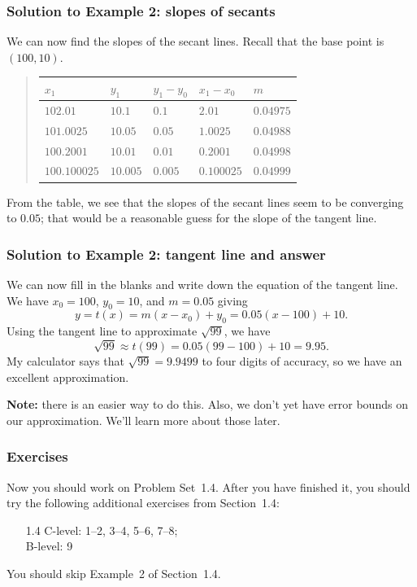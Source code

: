 \documentclass[serif,ignorenonframetext]{beamer}
\begin{document}
\begin{frame}
  \frametitle{Solution to Example 2: slopes of secants}
  We can now find the slopes of the secant lines.  Recall that the
  base point is $(100,10)$.
  \begin{quote}
    \begin{tabular}{|l|l|l|l|l|}
      \hline
      $x_1$        & $y_1$    & $y_1-y_0$   & $x_1-x_0$   & $m$       \\
      \hline
      $102.01$     & $10.1$   & $0.1$       & $2.01$      & $0.04975$ \\
      $101.0025$   & $10.05$  & $0.05$      & $1.0025$    & $0.04988$ \\
      $100.2001$   & $10.01$  & $0.01$      & $0.2001$    & $0.04998$ \\
      $100.100025$ & $10.005$ & $0.005$     & $0.100025$  & $0.04999$ \\
      \hline
    \end{tabular}
  \end{quote}
  From the table, we see that the slopes of the secant lines seem to
  be converging to $0.05$; that would be a reasonable guess for the slope
  of the tangent line.
\end{frame}

\begin{frame}
  \frametitle{Solution to Example 2: tangent line and answer}
  We can now fill in the blanks and write down the equation of
  the tangent line.  We have $x_0=100$, $y_0=10$, and $m=0.05$
  giving
  \begin{displaymath}
    y=t(x)=m(x-x_0)+y_0 = 0.05(x-100)+10.
  \end{displaymath}
  Using the tangent line to approximate $\sqrt{99}$, we have
  \begin{displaymath}
    \sqrt{99} \approx t(99) = 0.05(99-100)+10 = 9.95.
  \end{displaymath}
  My calculator says that $\sqrt{99}=9.9499$ to four digits of accuracy,
  so we have an excellent approximation.

  \textbf{Note:} there is an easier way to do this.  Also, we don't
  yet have error bounds on our approximation.  We'll learn more about
  those later.
\end{frame}


\begin{frame}
  \frametitle{Exercises}
  Now you should work on Problem Set~1.4.  After you have finished it,
  you should try the following additional exercises from Section~1.4:
  \begin{itemize}
  \item[1.4] C-level: 1--2, 3--4, 5--6, 7--8; \\
    B-level: 9
  \end{itemize}
  You should skip Example~2 of Section~1.4.
\end{frame}
  
\end{document}
